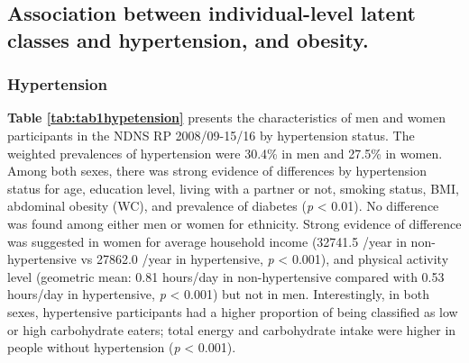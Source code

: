 

\subsection{Association between individual-level latent classes and hypertension, and obesity.}\vspace{-0.3cm}

\subsubsection{Hypertension}\vspace{-0.3cm}

\textbf{Table \ref{tab:tab1hypetension}} presents the characteristics of men and women participants in the NDNS RP 2008/09-15/16 by hypertension status. The weighted prevalences of hypertension were 30.4\% in men and 27.5\% in women. Among both sexes, there was strong evidence of differences by hypertension status for age, education level, living with a partner or not, smoking status, BMI, abdominal obesity (WC), and prevalence of diabetes (\textit{p} < 0.01). No difference was found among either men or women for ethnicity. Strong evidence of difference was suggested in women for average household income (32741.5 \textsterling/year in non-hypertensive vs 27862.0 \textsterling/year in hypertensive, \textit{p} < 0.001), and physical activity level (geometric mean: 0.81 hours/day in non-hypertensive compared with 0.53 hours/day in hypertensive, \textit{p} < 0.001) but not in men. Interestingly, in both sexes, hypertensive participants had a higher proportion of being classified as low or high carbohydrate eaters; total energy and carbohydrate intake were higher in people without hypertension (\textit{p} < 0.001).

